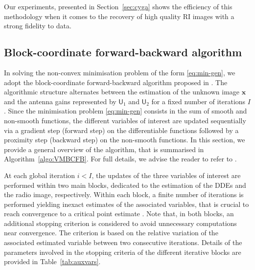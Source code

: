 \documentclass[fleqn,usenatbib]{mnras}
\newcommand{\xb}{\ensuremath{\boldsymbol{x}}}
\newcommand{\Ub}{\ensuremath{\boldsymbol{\mathsf{U}}}}
\begin{document}
Our experiments, presented in Section~\ref{sec:cyga} shows the efficiency of this methodology when it comes to the recovery of high quality RI images with a strong fidelity to data.


\subsection{Block-coordinate forward-backward algorithm}\label{ssec:BCFWA}

In solving the non-convex minimisation problem of the form \eqref{eq:min-gen}, we adopt the block-coordinate forward-backward algorithm proposed in \citet{Repetti2017}. The algorithmic structure alternates between the estimation of the unknown
image $\xb$ and the antenna gains represented by $\Ub_{1}$ and $\Ub_{2}$ for a fixed number of iterations $I$. Since the minimisation problem \eqref{eq:min-gen} consists in the sum of smooth and non-smooth functions, the different variables of interest are updated sequentially via a gradient step (forward step) on the differentiable functions followed by a proximity step (backward step) on the non-smooth functions. In this section, we provide a general overview of the algorithm, that is summarised in Algorithm~\ref{algo:VMBCFB}. For full details, we advise the reader to refer to \citet{Repetti2017}. 


%

%
At each global iteration $i < I$, the updates of the three variables of interest are performed within two main blocks, dedicated to the estimation of the DDEs and the radio image, respectively. Within each block, a finite number of iterations is performed yielding inexact estimates of the associated variables, that is crucial to reach convergence {to a critical point estimate} \citep{Repetti2017}. {{Note that, in both blocks, an additional stopping criterion is considered to avoid unnecessary computations near convergence. The criterion is based on the relative variation of the associated estimated variable between two consecutive iterations. Details of the parameters involved in the stopping criteria of the different iterative blocks are provided in Table~\ref{tab:auxvars}.}}
\end{document}
